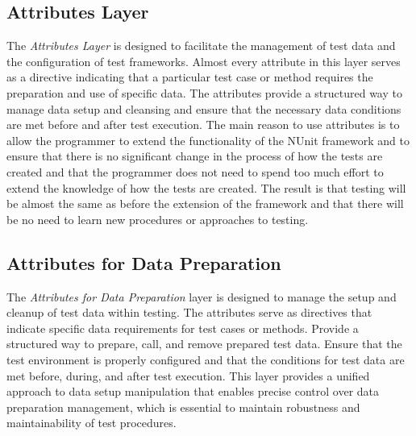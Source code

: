 \subsection{Attributes Layer}

The \textit{Attributes Layer} is designed to facilitate the management of test data and the configuration of test frameworks. Almost every attribute in this layer serves as a directive indicating that a particular test case or method requires the preparation and use of specific data. The attributes provide a structured way to manage data setup and cleansing and ensure that the necessary  data conditions are met before and after test execution. The main reason to use attributes is to allow the programmer to extend the functionality of the NUnit framework and to ensure that there is no significant change in the process of how the tests are created and that the programmer does not need to spend too much effort to extend the knowledge of how the tests are created. The result is that testing will be almost the same as before the extension of the framework and that there will be no need to learn new procedures or approaches to testing.


\subsection*{Attributes for Data Preparation}

The \textit{Attributes for Data Preparation} layer is designed to manage the setup and cleanup of test data within testing. The attributes serve as directives that indicate specific data requirements for test cases or methods. Provide a structured way to prepare, call, and remove prepared test data.  Ensure that the test environment is properly configured and that the conditions for test data are met before, during, and after test execution. This layer provides a unified approach to data setup manipulation that enables precise control over data preparation management, which is essential to maintain robustness and maintainability of test procedures.

